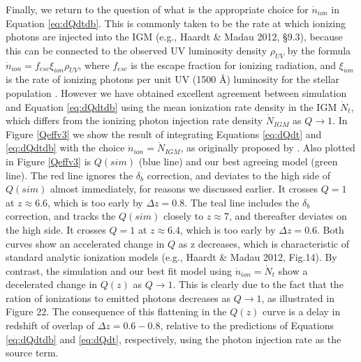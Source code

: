 Finally, we return to the question of what is the appropriate choice for $\dot{n}_{ion}$ in Equation \eqref{eq:dQdtdb}. This is commonly taken to be the rate at which ionizing photons are injected into the IGM (e.g., Haardt \& Madau 2012, \S9.3), because this can be connected to the observed UV luminosity density $\rho_{UV}$ by the formula $\dot{n}_{ion}=f_{esc}\xi_{ion}\rho_{UV}$, where $f_{esc}$ is the escape fraction for ionizing radiation, and $\xi_{ion}$ is the rate of ionizing photons per unit UV (1500 \AA{}) luminosity for the stellar population \citep{RobertsonEtAl2013}. However we have obtained excellent agreement between simulation and Equation \eqref{eq:dQdtdb} using the mean ionization rate density in the IGM  $\dot{N}_t$, which differs from the ionizing photon injection rate density $\dot{N}_{IGM}$ as $Q \rightarrow 1$. In Figure \ref{Qeffv3} we show the result of integrating Equations \eqref{eq:dQdt} and \eqref{eq:dQdtdb} with the choice $\dot{n}_{ion}=\dot{N}_{IGM}$, as originally proposed by \citep{MadauEtAl1999}. Also plotted in Figure \ref{Qeffv3} is $Q(sim)$ (blue line) and our best agreeing model (green line). The red line ignores the $\delta_b$ correction, and deviates to the high side of $Q(sim)$ almost immediately, for reasons we discussed earlier. It crosses $Q=1$ at $z\approx 6.6$, which is too early by $\Delta z =0.8$. The teal line includes the $\delta_b$ correction, and tracks the $Q(sim)$ closely to $z \approx 7$, and thereafter deviates on the high side. It crosses $Q=1$ at $z\approx 6.4$, which is too early by $\Delta z =0.6$. Both curves show an accelerated change in $Q$  as z decreases, which is characteristic of standard analytic ionization models (e.g., Haardt \& Madau 2012, Fig.14). By contrast, the simulation and our best fit model using $\dot{n}_{ion}=\dot{N}_t$ show a decelerated change in $Q(z)$ as $Q \rightarrow 1$. This is clearly due to the fact that the ration of ionizations to emitted photons decreases as $Q \rightarrow 1$, as illustrated in Figure 22. The consequence of this flattening in the $Q(z)$ curve is a delay in redshift of overlap of $\Delta z=0.6-0.8$, relative to the predictions of Equations \eqref{eq:dQdtdb} and \eqref{eq:dQdt}, respectively, using the photon injection rate as the source term. 

